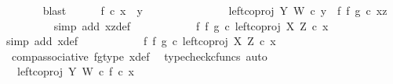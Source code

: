 \begin{isabellebody}
\ \ \ \ \ \ \isamarkupfalse%
\ blast\isanewline
\ \ \ \ \isamarkupfalse%
\ {\isachardoublequoteopen}f\ {\isasymcirc}\isactrlsub c\ x\ {\isacharequal}{\kern0pt}\ y{\isachardoublequoteclose}\isanewline
\ \ \ \ \isamarkupfalse%
\ {\isacharminus}{\kern0pt}\ \isanewline
\ \ \ \ \ \ \isamarkupfalse%
\ {\isachardoublequoteopen}left{\isacharunderscore}{\kern0pt}coproj\ Y\ W\ {\isasymcirc}\isactrlsub c\ y\ {\isacharequal}{\kern0pt}\ {\isacharparenleft}{\kern0pt}f\ {\isasymbowtie}\isactrlsub f\ g{\isacharparenright}{\kern0pt}\ {\isasymcirc}\isactrlsub c\ xz{\isachardoublequoteclose}\isanewline
\ \ \ \ \ \ \ \ \isamarkupfalse%
\ {\isacharparenleft}{\kern0pt}simp\ add{\isacharcolon}{\kern0pt}\ xz{\isacharunderscore}{\kern0pt}def{\isacharparenright}{\kern0pt}\isanewline
\ \ \ \ \ \ \isamarkupfalse%
\ \isamarkupfalse%
\ {\isachardoublequoteopen}{\isachardot}{\kern0pt}{\isachardot}{\kern0pt}{\isachardot}{\kern0pt}\ {\isacharequal}{\kern0pt}\ {\isacharparenleft}{\kern0pt}f\ {\isasymbowtie}\isactrlsub f\ g{\isacharparenright}{\kern0pt}\ {\isasymcirc}\isactrlsub c\ left{\isacharunderscore}{\kern0pt}coproj\ X\ Z\ {\isasymcirc}\isactrlsub c\ x{\isachardoublequoteclose}\isanewline
\ \ \ \ \ \ \ \ \isamarkupfalse%
\ {\isacharparenleft}{\kern0pt}simp\ add{\isacharcolon}{\kern0pt}\ x{\isacharunderscore}{\kern0pt}def{\isacharparenright}{\kern0pt}\isanewline
\ \ \ \ \ \ \isamarkupfalse%
\ \isamarkupfalse%
\ {\isachardoublequoteopen}{\isachardot}{\kern0pt}{\isachardot}{\kern0pt}{\isachardot}{\kern0pt}\ {\isacharequal}{\kern0pt}\ {\isacharparenleft}{\kern0pt}{\isacharparenleft}{\kern0pt}f\ {\isasymbowtie}\isactrlsub f\ g{\isacharparenright}{\kern0pt}\ {\isasymcirc}\isactrlsub c\ left{\isacharunderscore}{\kern0pt}coproj\ X\ Z{\isacharparenright}{\kern0pt}\ {\isasymcirc}\isactrlsub c\ x{\isachardoublequoteclose}\isanewline
\ \ \ \ \ \ \ \ \isamarkupfalse%
\ \ comp{\isacharunderscore}{\kern0pt}associative{}\ fg{\isacharunderscore}{\kern0pt}type\ x{\isacharunderscore}{\kern0pt}def\ \isamarkupfalse%
\ {\isacharparenleft}{\kern0pt}typecheck{\isacharunderscore}{\kern0pt}cfuncs{\isacharcomma}{\kern0pt}\ auto{\isacharparenright}{\kern0pt}\isanewline
\ \ \ \ \ \ \isamarkupfalse%
\ \isamarkupfalse%
\ {\isachardoublequoteopen}{\isachardot}{\kern0pt}{\isachardot}{\kern0pt}{\isachardot}{\kern0pt}\ {\isacharequal}{\kern0pt}\ {\isacharparenleft}{\kern0pt}left{\isacharunderscore}{\kern0pt}coproj\ Y\ W\ {\isasymcirc}\isactrlsub c\ f{\isacharparenright}{\kern0pt}\ {\isasymcirc}\isactrlsub c\ x{\isachardoublequoteclose}\isanewline

\end{isabellebody}
